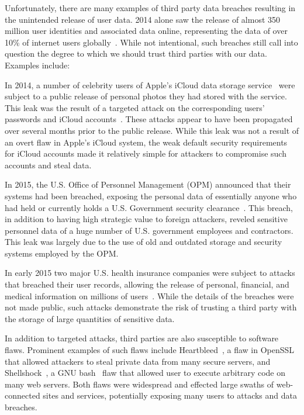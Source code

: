 Unfortunately, there are many examples of third party data breaches
resulting in the unintended release of user data. 2014 alone saw the
release of almost 350 million user identities and associated data
online, representing the data of over 10\% of internet users
globally~\cite{symanteccorporation2015}. While not intentional, such
breaches still call into question the degree to which we should trust
third parties with our data. Examples include:

\begin{packed_desc}
\item[Apple iCloud Celebrity Photo Leak:] In 2014, a number of
  celebrity users of Apple's iCloud data storage
  service~\cite{apple-icloud} were subject to a public release of
  personal photos they had stored with the service. This leak was the
  result of a targeted attack on the corresponding users' passwords
  and iCloud accounts~\cite{apple-icloudleak}. These attacks appear to
  have been propagated over several months prior to the public
  release. While this leak was not a result of an overt flaw in
  Apple's iCloud system, the weak default security requirements for
  iCloud accounts made it relatively simple for attackers to
  compromise such accounts and steal data.
\item[Office of Personnel Management Breach:] In 2015, the U.S. Office
  of Personnel Management (OPM) announced that their systems had been
  breached, exposing the personal data of essentially anyone who had
  held or currently holds a U.S. Government security
  clearance~\cite{ars-opmhack, opm-cybersecurityincidents}. This
  breach, in addition to having high strategic value to foreign
  attackers, reveled sensitive personnel data of a huge number of U.S.
  government employees and contractors. This leak was largely due to
  the use of old and outdated storage and security systems employed by
  the OPM.
\item[Anthem and Premera Blue Cross Breaches:] In early 2015 two major
  U.S. health insurance companies were subject to attacks that breached
  their user records, allowing the release of personal, financial, and
  medical information on millions of users~\cite{krebs-anthem,
    krebs-premera}. While the details of the breaches were not made
  public, such attacks demonstrate the risk of trusting a third party
  with the storage of large quantities of sensitive data.
\item[Heartbleed, Shellshock, etc:] In addition to targeted attacks,
  third parties are also susceptible to software flaws. Prominent
  examples of such flaws include Heartbleed~\cite{heartbleed}, a flaw
  in OpenSSL~\cite{openssl} that allowed attackers to steal private
  data from many secure servers, and
  Shellshock~\cite{symantec-shellshock}, a GNU bash~\cite{gnu-bash}
  flaw that allowed user to execute arbitrary code on many web
  servers. Both flaws were widespread and effected large swaths of
  web-connected sites and services, potentially exposing many users to
  attacks and data breaches.
\end{packed_desc}


